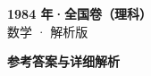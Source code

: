 \documentclass[zihao=-4, a4paper]{ctexart}
\begin{document}
\begin{center}
  {\Large\bfseries 1984 年·全国卷（理科）}\\[4pt]
  {\large 数学 · 解析版}
\end{center}
\medskip
{}

\clearpage
{}
\begin{center}{\Large\bfseries 参考答案与详细解析}\end{center}
\medskip

\end{document}
